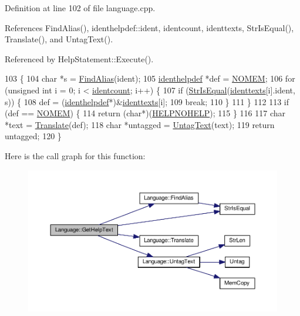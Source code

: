 Definition at line 102 of file language.\+cpp.



References Find\+Alias(), identhelpdef\+::ident, identcount, identtexts, Str\+Is\+Equal(), Translate(), and Untag\+Text().



Referenced by Help\+Statement\+::\+Execute().


\begin{DoxyCode}
103 \{
104     \textcolor{keywordtype}{char} *s = \hyperlink{classLanguage_a14a991ea42d5d0482911d459ee68e8be}{FindAlias}(ident);
105     \hyperlink{structidenthelpdef}{identhelpdef} *def = \hyperlink{platform_8h_a46ff2bfbf0d44b8466a2251d5bd5e6f8}{NOMEM};
106     \textcolor{keywordflow}{for} (\textcolor{keywordtype}{unsigned} \textcolor{keywordtype}{int} i = 0; i < \hyperlink{classLanguage_a470e68c0f7517f8f8ffa9ba315b52b0a}{identcount}; i++) \{
107         \textcolor{keywordflow}{if} (\hyperlink{clib_8h_a2a1f39d11cbbaac992d42e67557dac4b}{StrIsEqual}(\hyperlink{ident_8h_a86edb1ac19ff6f1a138bc71d5d57569a}{identtexts}[i].ident, s)) \{
108             def = (\hyperlink{structidenthelpdef}{identhelpdef}*)&\hyperlink{ident_8h_a86edb1ac19ff6f1a138bc71d5d57569a}{identtexts}[i];
109             \textcolor{keywordflow}{break};
110         \}
111     \}
112 
113     \textcolor{keywordflow}{if} (def == \hyperlink{platform_8h_a46ff2bfbf0d44b8466a2251d5bd5e6f8}{NOMEM}) \{
114         \textcolor{keywordflow}{return} (\textcolor{keywordtype}{char}*)(\hyperlink{text_8h_a45a20702609f9cc519f35b0d9358a2f3}{HELPNOHELP});
115     \}
116 
117     \textcolor{keywordtype}{char} *text = \hyperlink{classLanguage_ae4515a9a4191e57c5ccab61e99687818}{Translate}(def);
118     \textcolor{keywordtype}{char} *untagged = \hyperlink{classLanguage_a69c5b3269ec8570a2f8f28e8e632cf44}{UntagText}(text);
119     \textcolor{keywordflow}{return} untagged;
120 \}
\end{DoxyCode}


Here is the call graph for this function\+:\nopagebreak
\begin{figure}[H]
\begin{center}
\leavevmode
\includegraphics[width=350pt]{classLanguage_a0044feceac32f8ce943b88165ade965e_cgraph}
\end{center}
\end{figure}




